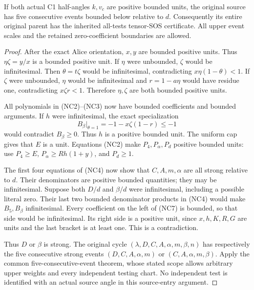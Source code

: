 \begin{theorem}
If both actual C1 half-angles $k,v_c$ are positive bounded units,
the original source has five consecutive events bounded below relative
to $d$. Consequently its entire original parent has the inherited
all-tests tensor-SOS certificate. All upper event scales and the
retained zero-coefficient boundaries are allowed.
\end{theorem}
\begin{proof}
After the exact Alice orientation, $x,y$ are bounded positive units.
Thus $\eta\zeta=y/x$ is a bounded positive unit. If $\eta$ were
unbounded, $\zeta$ would be infinitesimal. Then $\theta=t\zeta$
would be infinitesimal, contradicting $x\eta(1-\theta)<1$.
If $\zeta$ were unbounded, $\eta$ would be infinitesimal and
$r=1-a\eta$ would have residue one, contradicting $x\zeta r<1$.
Therefore $\eta,\zeta$ are both bounded positive units.

All polynomials in (NC2)--(NC3) now have bounded coefficients and
bounded arguments. If $h$ were infinitesimal, the exact specialization
\[
             B_\beta\big|_{\theta=1}
                    =-1-x\zeta(1-r)\le-1
\]
would contradict $B_\beta\ge0$. Thus $h$ is a positive bounded
unit. The uniform cap gives that $E$ is a unit. Equations (NC2) make
$P_4,P_\alpha,P_d$ positive bounded units: use $P_4\ge E$,
$P_\alpha\ge Rh(1+y)$, and $P_d\ge1$.

The first four equations of (NC4) now show that
$C,A,m,\alpha$ are all strong relative to $d$. Their denominators
are positive bounded quantities; they may be infinitesimal. Suppose
both $D/d$ and $\beta/d$ were infinitesimal, including a possible
literal zero. Their last two bounded denominator products in (NC4)
would make $B_5,B_\beta$ infinitesimal. Every coefficient on the
left of (NC7) is bounded, so that side would be infinitesimal. Its
right side is a positive unit, since $x,h,K,R,G$ are units and the
last bracket is at least one. This is a contradiction.

Thus $D$ or $\beta$ is strong. The original cycle
$(\lambda,D,C,A,\alpha,m,\beta,n)$ has respectively the five
consecutive strong events $(D,C,A,\alpha,m)$ or
$(C,A,\alpha,m,\beta)$. Apply the common five-consecutive-event
theorem, whose stated scope allows arbitrary upper weights and every
independent testing chart. No independent test is identified with
an actual source angle in this source-entry argument.
\end{proof}



